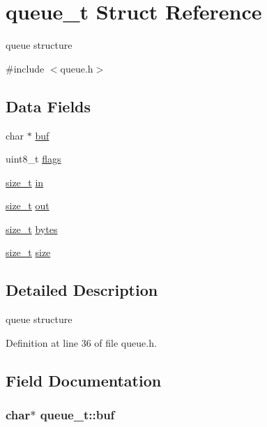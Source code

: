 \hypertarget{structqueue__t}{}\section{queue\+\_\+t Struct Reference}
\label{structqueue__t}


queue structure  




{\ttfamily \#include $<$queue.\+h$>$}

\subsection*{Data Fields}
\begin{DoxyCompactItemize}
\item 
char $\ast$ \hyperlink{structqueue__t_aaee81421d150a17123a2b858d5b1685d}{buf}
\item 
uint8\+\_\+t \hyperlink{structqueue__t_a2a516773a572c746d461c9df3cb30387}{flags}
\item 
\hyperlink{user__config_8h_aea0c7eab1ce1eebb4e879ef4e23c16ee}{size\+\_\+t} \hyperlink{structqueue__t_a7a6832e36c70a1db7fddc93fb6be9d63}{in}
\item 
\hyperlink{user__config_8h_aea0c7eab1ce1eebb4e879ef4e23c16ee}{size\+\_\+t} \hyperlink{structqueue__t_a8f6e1c623d2ceed398a71a0aab93b0fa}{out}
\item 
\hyperlink{user__config_8h_aea0c7eab1ce1eebb4e879ef4e23c16ee}{size\+\_\+t} \hyperlink{structqueue__t_a58398d4ee60bc90ffba2bc3488fe185b}{bytes}
\item 
\hyperlink{user__config_8h_aea0c7eab1ce1eebb4e879ef4e23c16ee}{size\+\_\+t} \hyperlink{structqueue__t_a83a13b888f9d4ef127d706559818b779}{size}
\end{DoxyCompactItemize}


\subsection{Detailed Description}
queue structure 

Definition at line 36 of file queue.\+h.



\subsection{Field Documentation}
\subsubsection[{\texorpdfstring{buf}{buf}}]{\setlength{\rightskip}{0pt plus 5cm}char$\ast$ queue\+\_\+t\+::buf}\hypertarget{structqueue__t_aaee81421d150a17123a2b858d5b1685d}{}\label{structqueue__t_aaee81421d150a17123a2b858d5b1685d}


